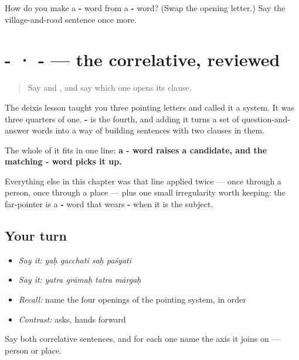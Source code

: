 \begin{tcolorbox}[breakable,colback=teal!4,colframe=teal!35!black,title={Before you move on}]
How do you make a \textbf{-} word from a \textbf{-} word? (Swap the opening letter.) Say the village-and-road sentence once more.
\end{tcolorbox}
\section[\texorpdfstring{\sk{य}- · \sk{त}- (ya- · ta-)}{य- · त- (ya- · ta-)}]{- · - — the correlative, reviewed}

\label{lesson:SA-R53-correlative}



\begin{quote}
Say \textbf{} and \textbf{}, and say which one opens its clause.
\end{quote}

\begin{grammarlens}[title={What you've built}]
The deixis lesson taught you three pointing letters and called it a system. It was three quarters of one. \textbf{-} is the fourth, and adding it turns a set of question-and-answer words into a way of building sentences with two clauses in them.

The whole of it fits in one line: \textbf{a - word raises a candidate, and the matching - word picks it up.}

Everything else in this chapter was that line applied twice — once through a person, once through a place — plus one small irregularity worth keeping: the far-pointer is a \textbf{-} word that wears \textbf{-} when it is the subject.
\end{grammarlens}

\subsection*{Your turn}
\begin{itemize}
\raggedright
  \item \emph{Say it:} \emph{yaḥ gacchati saḥ paśyati}
  \item \emph{Say it:} \emph{yatra grāmaḥ tatra mārgaḥ}
  \item \emph{Recall:} name the four openings of the pointing system, in order
  \item \emph{Contrast:} \textbf{} asks, \textbf{} hands forward
\end{itemize}

\begin{tcolorbox}[breakable,colback=teal!4,colframe=teal!35!black,title={Before you move on}]
Say both correlative sentences, and for each one name the axis it joins on — person or place.
\end{tcolorbox}

